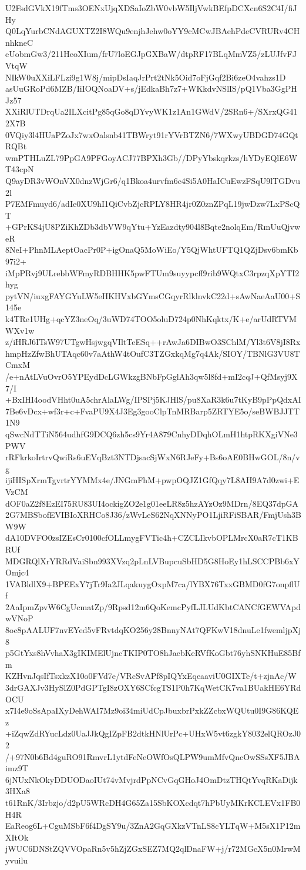 U2FsdGVkX19fTms3OENxUjqXDSaIoZbW0vbW5IljVwkBEfpDCXcn6S2C4I/fiJHy
Q0LqYurbCNdAGUXTZ2I8WQu9enjhJehw0oYY9cMCwJBAehPdeCVRURv4CHnhkneC
eUobmGw3/211HeoXIum/frU7loEGJpGXBaW/dtpRF17BLqMmVZ5/zLUJfvFJVtqW
NIkW0uXXiLFLzi9g1W8j/mipDsIaqJrPrt2tNk5Oid7oFjGqf2Bi6zeO4vahzs1D
asUuGRoPd6MZB/IiIOQNoaDV+s/jEdkaBh7z7+WKkdvNSlIS/pQ1Vba3GgPHJz57
XXiRlUTDrqUa2ILXcitPg85qGo8qDYvyWK1z1An1GWdV/2SRn6+/SXrxQG412X7B
0VQiy3l4HUaPZoJx7wxOalsnb41TBWryt91rYVrBTZN6/7WXwyUBDGD74GQtRQBt
wmPTHLuZL79PpGA9PFGoyACJ77BPXh3Gb//DPyYbskqrkzs/hYDyEQlE6WT43cpN
Q9ayDR3vWOnVX0dnzWjGr6/q1Bkoa4urvfm6c4Si5A0HaICuEwzFSqU9lTGDvu2l
P7EMFmuyd6/adIe0XU9hI1QiCvbZjcRPLY8HR4jr0Z0znZPqL19jwDzw7LxPScQT
+GPrKS4jU8PZiKhZDb3dbVW9qYtu+YzEazdty904l8Bqte2nolqEm/RmUuQjvweR
8NeI+PhnMLAeptOacPr0P+igOnaQ5MoWiEo/Y5QjWhtUFTQ1QZjDsv6bmKb97i2+
iMpPRvj9ULrebbWFmyRDBHHK5pwFTUm9suyypcff9rib9WQtxC3rpzqXpYTI2hyg
pytVN/iuxgFAYGYuLW5eHKHVxbGYmsCGqyrRlklnvkC22d+sAwNaeAaU00+S145e
k4TRe1UHg+qcYZ3neOq/3uWD74TOO5oluD724p0NhKqktx/K+e/arUdRTVMWXv1w
z/iHRJ6ITsW97UTgwHsjwgqVIltTeESq++rAwJa6DIBwO3SChlM/Yl3t6V8jI8Rx
hmpHzZfwBhUTAqc60v7aAthW4tOufC3TZGxkqMg7q4Ak/SIOY/TBNlG3VU8TCmxM
/e+nAtLVuOvrO5YPEydDcLGWkzgBNbFpGglAh3qw5l8fd+mI2cqJ+QfMsyj9X7/I
+BxIHI4oodVHht0uA5chrAlaLWg/IPSPj5KJHlS/pu8XaR3k6u7tKyB9pPpQdxAI
7Be6vDcx+wf3r+c+FvaPU9X4J3Eg3gooClpTnMRBarp5ZRTYE5o/seBWBJJTT1N9
qSwcNdTTiN564udhfG9DCQ6zh5cs9Yr4A879CnhyDDqhOLmH1htpRKXgiVNe3PWV
rRFkrkoIrtrvQwiRs6uEVqBzt3NTDjsacSjWxN6RJeFy+Bs6oAE0BHwGOL/8n/vg
ijiHISpXrmTgvrtrYYMMx4e/JNGmFhM+pwpOQJZ1GfQqy7L8AH9A7d0zwi+EVzCM
dOF0aZ2f8EzEI75RU83UI4ockigZO2e1g01eeLR8z5hzAYzOz9MDrn/8EQ37dpGA
2G7MBSbofEVIBIoXRHCo8J36/zWvLeS62NqXNNyPO1LjiRFiSBAR/FmjUsh3BW9W
dA10DVFO0zsIZEsCr0100cfOLLmygFVTic4h+CZCLIkvbOPLMrcX0aR7cT1KBRUf
MDGRQlXrYRRdVaiSbn993XVzq2pLnLVBupcuSbHD5G8HoEy1hLSCCPBb6xYOmjc4
1VABldlX9+BPEExY7jTr9Ia2JLqakuygOxpM7ca/lYBX76TxxGBMD0fG7onpflUf
2AaIpmZpvW6CgUcmatZp/9Rpsd12m6QoKemcPyfLJLUdKbtCANCfGEWVApdwVNoP
8oc8pAALUF7nvEYed5vFRvtdqKO256y28BnnyNAt7QFKwV18dnuLe1fwemljpXj8
p5GtYxs8hVvhaX3gIKIMElUjncTKIP0TO8hJaebKeRVfKoGbt76yhSNKHuE85Bfm
KZHvnJqsIfTsxkzX10o0FVd7e/VRcSvAPf8pIQYxEqeaaviU0GIXTe/t+zjnAc/W
3drGAXJv3HySlZ0PdGPTgI8zOXY6SCfcgTS1P0h7KqWetCK7va1BUakHE6YRdOCU
x7I4e9oSsApaIXyDehWAI7Mz9oi34miUdCpJbuxbrPxkZZcbxWQUtu0I9G86KQEz
+iZqwZdRYucLdz0UaJJkQgIZpFB2dtkHNlUrPc+UHxW5vt6zgkY8032elQROzJ02
/+97N0b6Bd4guRO91RmvrL1ytdFeNeOWfOsQLPW9umMfvQncOwSSsXF5JBAimz9T
6jNUxNkOkyDDUODaoIUt74vMvjrdPpNCvGqGHoJ4OmDtzTHQtYvqRKaDijk3HXa8
t61RnK/3Irbzjo/d2pU5WRcDH4G65Za15SbKOXcdqt7hPbUyMKrKCLEVx1FB0H4R
EaReog6L+CguMSbF6f4DgSY9u/3ZnA2GqGXkzVTnLS8cYLTqW+M5sX1P12mXItOk
jWUC6DNStZQVVOpaRn5v5hZjZGxSEZ7MQ2qlDnaFW+j/r72MGcX5n0MrwMyvuilu
